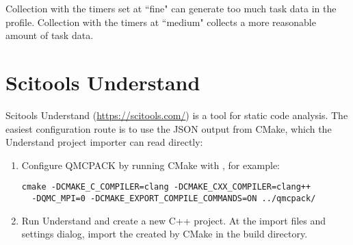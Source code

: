 Collection with the timers set at ``fine" can generate too much task data in the profile.
Collection with the timers at ``medium" collects a more reasonable amount of task data.

\section{Scitools Understand}

Scitools Understand (\url{https://scitools.com/}) is a tool for static
code analysis. The easiest configuration route is to use the JSON output
from CMake, which the Understand project importer can read directly:
\begin{enumerate}
\item Configure QMCPACK by running CMake with
  , for example:
  \begin{lstlisting}[style=SHELL]
  cmake -DCMAKE_C_COMPILER=clang -DCMAKE_CXX_COMPILER=clang++
  -DQMC_MPI=0 -DCMAKE_EXPORT_COMPILE_COMMANDS=ON ../qmcpack/
  \end{lstlisting}
\item Run Understand and create a new C++ project. At the import files
  and settings dialog, import the  created by
  CMake in the build directory.  
\end{enumerate}
